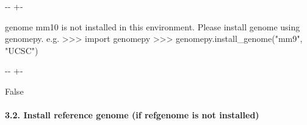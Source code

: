 \documentclass[letterpaper,10pt,english]{sphinxmanual}
\newlength\nbsphinxcodecellspacing
\begin{document}
{

\kern-\sphinxverbatimsmallskipamount\kern-\baselineskip
\kern+\FrameHeightAdjust\kern-\fboxrule
\vspace{\nbsphinxcodecellspacing}

\begin{sphinxVerbatim}[commandchars=\\\{\}]
genome mm10 is not installed in this environment.
Please install genome using genomepy.
e.g.
    >>> import genomepy
    >>> genomepy.install\_genome("mm9", "UCSC")
\end{sphinxVerbatim}
}

{

\kern-\sphinxverbatimsmallskipamount\kern-\baselineskip
\kern+\FrameHeightAdjust\kern-\fboxrule
\vspace{\nbsphinxcodecellspacing}

\begin{sphinxVerbatim}[commandchars=\\\{\}]
\llap{\color{nbsphinxout}[7]:\,\hspace{\fboxrule}\hspace{\fboxsep}}False
\end{sphinxVerbatim}
}


\paragraph{3.2. Install reference genome (if refgenome is not installed)}
\label{\detokenize{notebooks/02_motif_scan/02_atac_peaks_to_TFinfo_with_celloracle_190901:3.2.-Install-reference-genome-(if-refgenome-is-not-installed)}}
{
\begin{sphinxVerbatim}[commandchars=\\\{\}]
\llap{\color{nbsphinxin}[9]:\,\hspace{\fboxrule}\hspace{\fboxsep}} 
 
\end{sphinxVerbatim}
}
\end{document}

